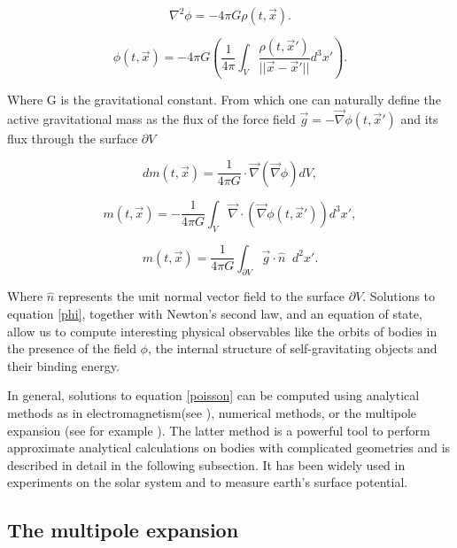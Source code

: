 \begin{equation}\label{poisson}
\nabla^2 \phi = -4\pi G \rho(t, \vec{x}).
\end{equation}

\begin{equation}\label{phi}
\phi(t, \vec{x}) = -4\pi G \left( \frac{1}{4\pi} \int_{V} \frac{\rho(t, \vec{x}')}{|| \vec{x}-\vec{x}' ||} d^3x'\right).
\end{equation}

Where G is the gravitational constant. From which one can naturally define the active gravitational mass as the flux of the force field $\vec{g}=-\vec{\nabla} \phi(t, \vec{x}')$ and its flux through the surface $\partial V$ 

\begin{equation}
dm(t, \vec{x}) = \frac{1}{4\pi G} \cdot \vec{\nabla}(\vec{\nabla}\phi) dV,
\end{equation}

\begin{equation}
m(t, \vec{x}) = -\frac{1}{4\pi G}\int_{V} \vec{\nabla} \cdot (\vec{\nabla} \phi(t, \vec{x}')) d^3 x' ,
\end{equation}

\begin{equation}\label{active mass}
m(t, \vec{x}) = \frac{1}{4\pi G}\int_{\partial V}  \vec{g}\cdot \hat{n}  \;\; d^2 x'.
\end{equation}


Where $\hat{n}$ represents the unit normal vector field to the surface $\partial V$. Solutions to equation \ref{phi}, together with Newton's second law, and an equation of state, allow us to compute interesting physical observables like the orbits of bodies in the presence of the field $\phi$, the internal structure of self-gravitating objects and their binding energy.


In general, solutions to equation \ref{poisson} can be computed using analytical methods as in electromagnetism(see \cite{Jackson:1998nia}), numerical methods, or the multipole expansion (see for example \cite{Thorne:1980ru}). The latter method is a powerful tool to perform approximate analytical calculations on bodies with complicated geometries and is described in detail in the following subsection. It has been widely used in experiments on the solar system and to measure earth's surface potential\cite{GOCE, GRACE}. 




\subsection{The multipole expansion}

